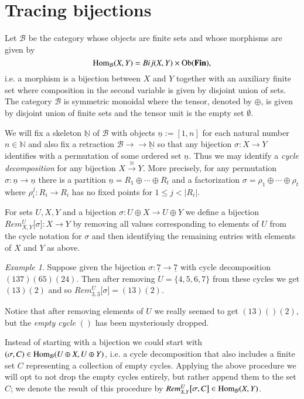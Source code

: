 \documentclass{amsart}
\def\tn{\textnormal}
\def\mc{\mathcal}
\def\NN{{\mathbb N}}
\def\Hom{\tn{Hom}}
\def\Ob{\tn{Ob}}
\def\to{\rightarrow}
\def\taking{\colon}
\def\iso{\cong}
\def\ul{\underline}
\newcommand{\onto}{\to\!\!\!\!\!\to}
\newcommand{\To}[1]{\xrightarrow{#1}}
\def\mcB{\mc{B}}
\def\Fin{{\bf Fin}}
\theoremstyle{remark}
\newtheorem{example}[subsection]{Example}
\theoremstyle{definition}
\begin{document}
\section{Tracing bijections}

Let $\mcB$ be the category whose objects are finite sets and whose morphisms are given by
$$\Hom_{\mcB}(X,Y)=Bij(X,Y)\times\Ob(\Fin),$$
i.e. a morphism is a bijection between $X$ and $Y$ together with an auxiliary finite set where composition in the second variable is given by disjoint union of sets.  The category $\mcB$ is symmetric monoidal where the tensor, denoted by $\oplus$, is given by disjoint union of finite sets and the tensor unit is the empty set $\emptyset$.  

We will fix a skeleton $\ul\NN$ of $\mcB$ with objects $\ul{n}:=[1,n]$ for each natural number $n\in\NN$ and also fix a retraction $\mcB\onto\ul\NN$ so that any bijection $\sigma:X\to Y$ identifies with a permutation of some ordered set $\ul{n}$.  Thus we may identify a {\em cycle decomposition} for any bijection $X\To{\iso}Y$.  More precisely, for any permutation $\sigma:\ul{n}\to\ul{n}$ there is a partition $\ul{n}=R_1\oplus\cdots\oplus R_t$ and a factorization $\sigma=\rho_1\oplus\cdots\oplus\rho_t$ where $\rho_i^j:R_i\to R_i$ has no fixed points for $1\le j<|R_i|$.

For sets $U,X,Y$ and a bijection $\sigma:U\oplus X\to U\oplus Y$ we define a bijection $Rem^U_{X,Y}\big[\sigma\big]:X\to Y$ by removing all values corresponding to elements of $U$ from the cycle notation for $\sigma$ and then identifying the remaining entries with elements of $X$ and $Y$ as above.

\begin{example}
Suppose given the bijection $\sigma\taking\ul{7}\to\ul{7}$ with cycle decomposition $(1 3 7)(6 5)(2 4)$. Then after removing $U=\{4,5,6,7\}$ from these cycles we get $(13)(2)$ and so $Rem^U_{\ul{3},\ul{3}}\big[\sigma\big]=(1 3)(2)$. 

Notice that after removing elements of $U$ we really seemed to get $(13)()(2)$, but the {\em empty cycle} $()$ has been mysteriously dropped.
\end{example}

Instead of starting with a bijection we could start with $(\sigma,C)\in\Hom_\mcB(U\oplus X,U\oplus Y)$, i.e. a cycle decomposition that also includes a finite set $C$ representing a collection of empty cycles. Applying the above procedure we will opt to not drop the empty cycles entirely, but rather append them to the set $C$; we denote the result of this procedure by $Rem^U_{X,Y}\big[\sigma,C\big]\in\Hom_\mcB(X,Y)$.
\end{document}
